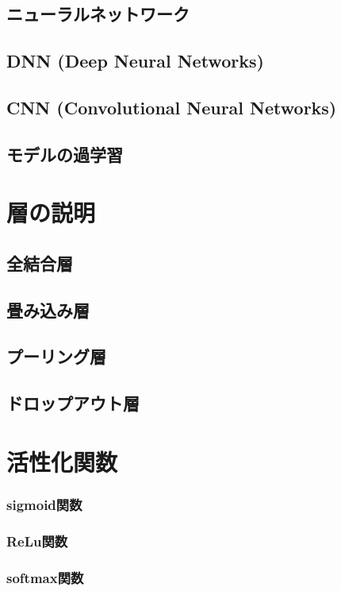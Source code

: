 \documentclass[a4j, 11pt]{jreport}
\begin{document}
\subsection{ニューラルネットワーク}

\subsection{DNN (Deep Neural Networks)}

\subsection{CNN (Convolutional Neural Networks)}

\subsection{モデルの過学習}



\newpage
\section{層の説明}
\subsection{全結合層}
\subsection{畳み込み層}
\subsection{プーリング層}
\subsection{ドロップアウト層}

\section{活性化関数}
\subsubsection{sigmoid関数}
\subsubsection{ReLu関数}
\subsubsection{softmax関数}
\end{document}
